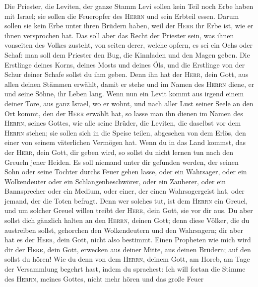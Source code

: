 Die Priester, die Leviten, der ganze Stamm Levi sollen
kein Teil noch Erbe haben mit Israel; sie sollen die Feueropfer des
\textsc{Herrn} und sein Erbteil essen.  Darum sollen sie
kein Erbe unter ihren Brüdern haben, weil der \textsc{Herr} ihr Erbe
ist, wie er ihnen versprochen hat.  Das soll aber das
Recht der Priester sein, was ihnen vonseiten des Volkes zusteht, von
seiten derer, welche opfern, es sei ein Ochs oder Schaf: man soll dem
Priester den Bug, die Kinnladen und den Magen geben.  Die
Erstlinge deines Korns, deines Mosts und deines Öls, und die Erstlinge
von der Schur deiner Schafe sollst du ihm geben.  Denn ihn
hat der \textsc{Herr}, dein Gott, aus allen deinen Stämmen erwählt,
damit er stehe und im Namen des \textsc{Herrn} diene, er und seine
Söhne, ihr Leben lang.  Wenn nun ein Levit kommt aus
irgend einem deiner Tore, aus ganz Israel, wo er wohnt, und nach aller
Lust seiner Seele an den Ort kommt, den der \textsc{Herr} erwählt hat,
 so lasse man ihn dienen im Namen des \textsc{Herrn},
seines Gottes, wie alle seine Brüder, die Leviten, die daselbst vor dem
\textsc{Herrn} stehen;  sie sollen sich in die Speise
teilen, abgesehen von dem Erlös, den einer von seinem väterlichen
Vermögen hat.  Wenn du in das Land kommst, das der
\textsc{Herr}, dein Gott, dir geben wird, so sollst du nicht lernen tun
nach den Greueln jener Heiden.  Es soll niemand unter dir
gefunden werden, der seinen Sohn oder seine Tochter durchs Feuer gehen
lasse, oder ein Wahrsager, oder ein Wolkendeuter oder ein
Schlangenbeschwörer, oder ein Zauberer,  oder ein
Bannsprecher oder ein Medium, oder einer, der einen Wahrsagergeist hat,
oder jemand, der die Toten befragt.  Denn wer solches
tut, ist dem \textsc{Herrn} ein Greuel, und um solcher Greuel willen
treibt der \textsc{Herr}, dein Gott, sie vor dir aus.  Du
aber sollst dich gänzlich halten an den \textsc{Herrn}, deinen Gott;
 denn diese Völker, die du austreiben sollst, gehorchen
den Wolkendeutern und den Wahrsagern; dir aber hat es der \textsc{Herr},
dein Gott, nicht also bestimmt.  Einen Propheten wie mich
wird dir der \textsc{Herr}, dein Gott, erwecken aus deiner Mitte, aus
deinen Brüdern; auf den sollst du hören!  Wie du denn von
dem \textsc{Herrn}, deinem Gott, am Horeb, am Tage der Versammlung
begehrt hast, indem du sprachest: Ich will fortan die Stimme des
\textsc{Herrn}, meines Gottes, nicht mehr hören und das große Feuer
